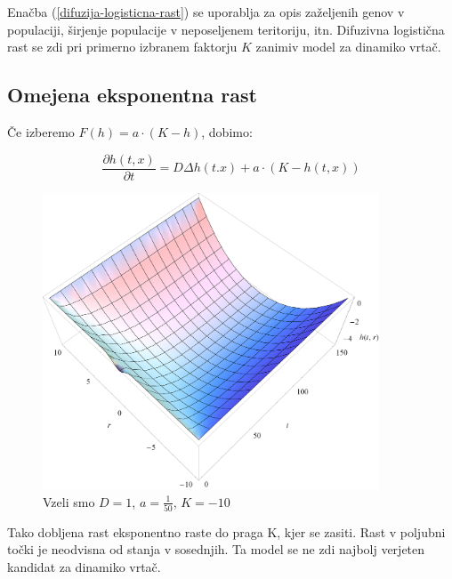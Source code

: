 \documentclass[a4paper, oneside, 12pt]{book}
\begin{document}
          Enačba (\ref{difuzija-logisticna-rast}) se uporablja za opis zaželjenih genov v populaciji, širjenje populacije v neposeljenem teritoriju, itn.
          Difuzivna logistična rast se zdi pri primerno izbranem faktorju $K$ zanimiv model za dinamiko vrtač.


          \subsection{Omejena eksponentna rast}

          Če izberemo $F(h) = a \cdot (K - h)$, dobimo:

            \begin{equation}
              \frac{ \partial h(t,x) }{ \partial t} = D \Delta h(t.x) + a \cdot (K - h(t,x))
              \label{difuzija-omejena-eksponentna-rast}
            \end{equation}

            \begin{figure}[H]
              \begin{center}
                \includegraphics[width=10cm]{slike/difuzija-omejena-eksponentna-rast2}
              \end{center}
              \caption{Vzeli smo $D=1$, $a=\frac{1}{50}$, $K=-10$}
              \label{fig:difuzija-omejena-eksponentna-rast}
            \end{figure}

          Tako dobljena rast eksponentno raste do praga K, kjer se zasiti. Rast v poljubni točki je neodvisna od stanja v sosednjih. Ta model se ne zdi najbolj verjeten kandidat za dinamiko vrtač.
\end{document}
